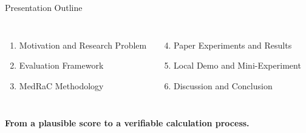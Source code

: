 \showsectionfooterfalse
\begin{frame}{Presentation Outline}
  \vspace{0.28cm}
  \begin{columns}[T,onlytextwidth]
      \begin{enumerate}
        \item Motivation and Research Problem
        \item Evaluation Framework
        \item MedRaC Methodology
      \end{enumerate}
      \begin{enumerate}
        \setcounter{enumi}{3}
        \item Paper Experiments and Results
        \item Local Demo and Mini-Experiment
        \item Discussion and Conclusion
      \end{enumerate}
  \end{columns}
  \vfill
  \centering
  {\Large\bfseries\color{DeepBlue}From a plausible score to a verifiable calculation process.}
\end{frame}
\showsectionfootertrue

